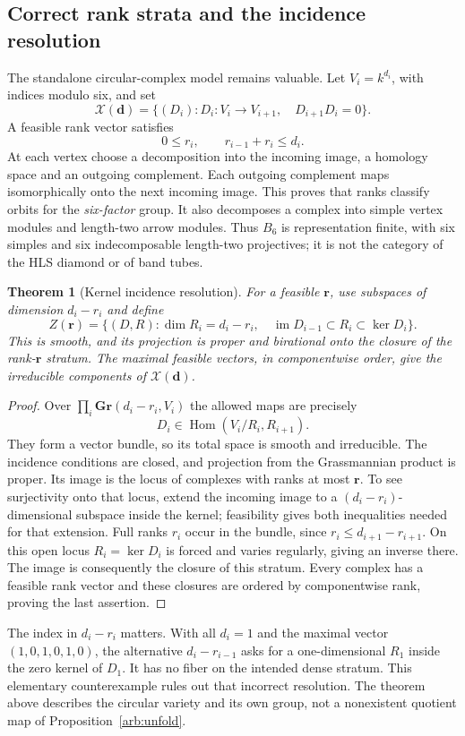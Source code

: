 \documentclass[11pt,oneside,openany]{book}
\newtheorem{theorem}{Theorem}[chapter]
\theoremstyle{definition}\newtheorem{definition}[theorem]{Definition}
\theoremstyle{remark}\newtheorem{remark}[theorem]{Remark}
\begin{document}
\subsection{Correct rank strata and the incidence resolution}
The standalone circular-complex model remains valuable. Let $V_i=k^{d_i}$,
with indices modulo six, and set
\[
 \mathcal X(\mathbf d)=\{(D_i):D_i:V_i\to V_{i+1},\quad D_{i+1}D_i=0\}.
\]
A feasible rank vector satisfies
\[
 0\le r_i,\qquad r_{i-1}+r_i\le d_i.
\]
At each vertex choose a decomposition into the incoming image, a homology
space and an outgoing complement. Each outgoing complement maps isomorphically
onto the next incoming image. This proves that ranks classify orbits for the
\emph{six-factor} group. It also decomposes a complex into simple vertex modules
and length-two arrow modules. Thus $B_6$ is representation finite, with six
simples and six indecomposable length-two projectives; it is not the category
of the HLS diamond or of band tubes.

\begin{theorem}[Kernel incidence resolution]
\label{arb:incidence}
For a feasible $\mathbf r$, use subspaces of dimension $d_i-r_i$ and define
\[
 Z(\mathbf r)=\{(D,R):\dim R_i=d_i-r_i,\quad
       \operatorname{im}D_{i-1}\subset R_i\subset\ker D_i\}.
\]
This is smooth, and its projection is proper and birational onto the closure
of the rank-$\mathbf r$ stratum. The maximal feasible vectors, in componentwise
order, give the irreducible components of $\mathcal X(\mathbf d)$.
\end{theorem}
\begin{proof}
Over $\prod_i\mathbf{Gr}(d_i-r_i,V_i)$ the allowed maps are precisely
\[
 D_i\in\operatorname{Hom}(V_i/R_i,R_{i+1}).
\]
They form a vector bundle, so its total space is smooth and irreducible.
The incidence conditions are closed, and projection from the Grassmannian
product is proper. Its image is the locus of complexes with ranks at most
$\mathbf r$. To see surjectivity onto that locus, extend the incoming image to
a $(d_i-r_i)$-dimensional subspace inside the kernel; feasibility gives both
inequalities needed for that extension. Full ranks $r_i$ occur in the bundle,
since $r_i\le d_{i+1}-r_{i+1}$. On this open locus $R_i=\ker D_i$ is forced
and varies regularly, giving an inverse there. The image is consequently the
closure of this stratum. Every complex has a feasible rank vector and these
closures are ordered by componentwise rank, proving the last assertion.
\end{proof}
The index in $d_i-r_i$ matters. With all $d_i=1$ and the maximal vector
$(1,0,1,0,1,0)$, the alternative $d_i-r_{i-1}$ asks for a one-dimensional
$R_1$ inside the zero kernel of $D_1$. It has no fiber on the intended dense
stratum. This elementary counterexample rules out that incorrect resolution.
The theorem above describes the circular variety and its own group, not a
nonexistent quotient map of Proposition~\ref{arb:unfold}.
\end{document}
